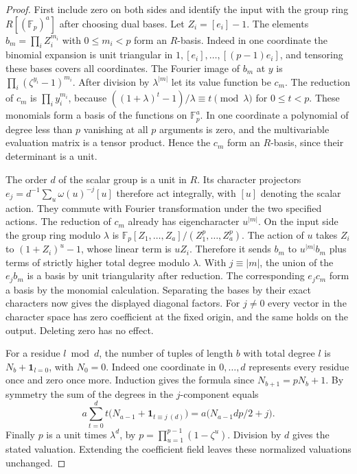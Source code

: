 \documentclass[a4paper,11pt]{article}
\theoremstyle{definition}
\theoremstyle{remark}
\numberwithin{equation}{section}
\begin{document}
\begin{proof}
First include zero on both sides and identify the input with the
group ring \(R[(\mathbb F_p)^a]\) after choosing dual bases.
Let \(Z_i=[e_i]-1\). The elements \(b_m=\prod_i Z_i^{m_i}\)
with \(0\le m_i<p\) form an \(R\)-basis. Indeed in one coordinate
the binomial expansion is unit triangular in
\(1,[e_i],\ldots,[(p-1)e_i]\), and tensoring these bases covers
all coordinates. The Fourier image of \(b_m\) at \(y\) is
\(\prod_i(\zeta^{y_i}-1)^{m_i}\). After division by
\(\lambda^{|m|}\) let its value function be \(c_m\). The reduction
of \(c_m\) is \(\prod_i y_i^{m_i}\), because
\(((1+\lambda)^t-1)/\lambda\equiv t\pmod\lambda\) for
\(0\le t<p\). These monomials form a basis of the functions on
\(\mathbb F_p^a\). In one coordinate a polynomial of degree
less than \(p\) vanishing at all \(p\) arguments is zero, and the
multivariable evaluation matrix is a tensor product. Hence the
\(c_m\) form an \(R\)-basis, since their determinant is a unit.

The order \(d\) of the scalar group is a unit in \(R\). Its
character projectors \(e_j=d^{-1}\sum_u\omega(u)^{-j}[u]\)
therefore act integrally, with \([u]\) denoting the scalar action.
They commute with Fourier transformation under the two specified
actions. The reduction of \(c_m\) already has eigencharacter
\(u^{|m|}\). On the input side the group ring modulo \(\lambda\)
is \(\mathbb F_p[Z_1,\ldots,Z_a]/(Z_1^p,\ldots,Z_a^p)\).
The action of \(u\) takes \(Z_i\) to \((1+Z_i)^u-1\), whose
linear term is \(uZ_i\). Therefore it sends \(b_m\) to
\(u^{|m|}b_m\) plus terms of strictly higher total degree
modulo \(\lambda\). With \(j\equiv |m|\), the union of the
\(e_j b_m\) is a basis by unit triangularity after reduction.
The corresponding \(e_j c_m\) form a basis by the monomial
calculation. Separating the bases by their exact characters now
gives the displayed diagonal factors. For \(j\ne0\) every vector
in the character space has zero coefficient at the fixed origin,
and the same holds on the output. Deleting zero has no effect.

For a residue \(l\bmod d\), the number of tuples of length \(b\)
with total degree \(l\) is \(N_b+\mathbf1_{l=0}\), with \(N_0=0\).
Indeed one coordinate in \(0,\ldots,d\) represents every residue
once and zero once more. Induction gives the formula since
\(N_{b+1}=pN_b+1\). By symmetry the sum of the degrees in the
\(j\)-component equals
\[
   a\sum_{t=0}^d t\big(N_{a-1}+\mathbf1_{t\equiv j\ (d)}\big)
                   =a\big(N_{a-1}dp/2+j\big).
\]
Finally \(p\) is a unit times \(\lambda^d\), by
\(p=\prod_{u=1}^{p-1}(1-\zeta^u)\). Division by \(d\) gives the stated
valuation. Extending the coefficient field leaves these normalized
valuations unchanged.
\end{proof}
\end{document}
